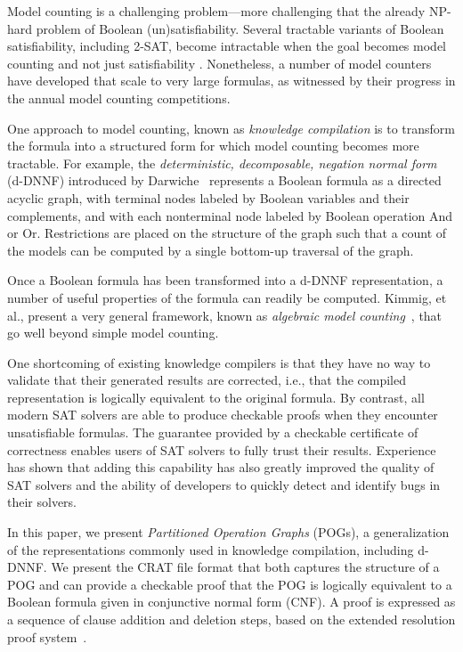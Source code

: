 \documentclass[letterpaper,USenglish,cleveref, autoref, thm-restate]{lipics-v2021}
\begin{document}
Model counting is a challenging problem---more challenging that the
already NP-hard problem of Boolean (un)satisfiability.  Several
tractable variants of Boolean satisfiability, including 2-SAT, become
intractable when the goal becomes model counting and not just
satisfiability \cite{valiant:siam:1979}.  Nonetheless, a number of
model counters have developed that scale to very large formulas, as
witnessed by their progress in the annual model counting competitions.

One approach to model counting, known as {\em knowledge compilation}
is to transform the formula into a structured form for which model
counting becomes more tractable.  For example, the {\em deterministic,
  decomposable, negation normal form} (d-DNNF) introduced by
Darwiche~\cite{darwiche:aaai:2002,darwiche:ecai:2004} represents a Boolean formula as a
directed acyclic graph, with terminal nodes labeled by Boolean
variables and their complements, and with each nonterminal node
labeled by Boolean operation And or Or.  Restrictions are placed on the
structure of the graph such that a count of the models can be computed
by a single bottom-up traversal of the graph.

Once a Boolean formula has been transformed into a d-DNNF
representation, a number of useful properties of the formula can
readily be computed.  Kimmig, et al., present a very general
framework, known as {\em algebraic model
counting}~\cite{kimmig:jal:2017}, that go well beyond simple model counting.

One shortcoming of existing knowledge compilers is that they have no
way to validate that their generated results are corrected, i.e., that
the compiled representation is logically equivalent to the original
formula.  By contrast, all modern SAT solvers are able to produce
checkable proofs when they encounter unsatisfiable formulas.  The
guarantee provided by a checkable certificate of correctness enables
users of SAT solvers to fully trust their results.  Experience has
shown that adding this capability has also greatly improved the quality of
SAT solvers and the ability of developers to quickly detect and
identify bugs in their solvers.

In this paper, we present \emph{Partitioned Operation Graphs} (POGs),
a generalization of the representations commonly used in knowledge
compilation, including d-DNNF\@.  We present the CRAT file format that
both captures the structure of a POG and can provide a checkable proof
that the POG is logically equivalent to a Boolean formula given in
conjunctive normal form (CNF).  A proof is expressed as a sequence of
clause addition and deletion steps, based on the extended resolution
proof system~\cite{Tseitin:1983}.
\end{document}
